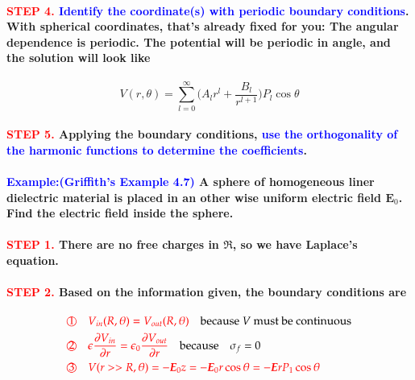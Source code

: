 \documentclass{article}
\begin{document}
\paragraph{\textcolor{red}{STEP 4.} \textcolor{blue}{Identify the coordinate(s) with periodic boundary conditions}. With spherical coordinates, that's already fixed for you: The angular dependence is periodic. The potential will be periodic in angle, and the solution will look like}
\begin{equation*}
    V(r,\theta)=\sum_{l=0}^{\infty}\bigg(A_l r^l +\frac{B_l}{r^{l+1}}\bigg)P_l\cos\theta
\end{equation*}
\paragraph{\textcolor{red}{STEP 5.} Applying the boundary conditions, \textcolor{blue}{use the orthogonality of the harmonic functions to determine the coefficients}.}
\paragraph{\textcolor{blue}{Example:(Griffith's Example 4.7)} A sphere of homogeneous liner dielectric material is placed in an other wise uniform electric field $\boldsymbol{E}_0$. Find the electric field inside the sphere.}
\paragraph{\textcolor{red}{STEP 1.} There are no \textbf{free} charges in $\mathfrak{R}$, so we have Laplace's equation.}
\paragraph{\textcolor{red}{STEP 2.} Based on the information given, the boundary conditions are}
\begin{align*}
    \textcolor{red}{\text{\textcircled{1}}} &\textcolor{red}{\quad V_{in}(R,\theta)=V_{out}(R,\theta)}\quad\text{because $V$ must be continuous}\\
    \textcolor{red}{\text{\textcircled{2}}} &\textcolor{red}{\quad \epsilon\frac{\partial V_{in}}{\partial r} =\epsilon_0\frac{\partial V_{out}}{\partial r}}\quad \text{because} \quad \sigma_f=0\\
    \textcolor{red}{\text{\textcircled{3}}} &\quad \textcolor{red}{V(r>>R,\theta)=-\boldsymbol{E}_0z=-\boldsymbol{E}_0 r\cos\theta=-\boldsymbol{E}rP_1\cos\theta}\\
\end{align*}
\end{document}
